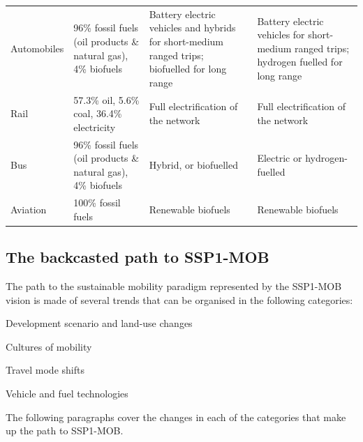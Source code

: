\begin{landscape}
{\begin{longtable}{p{3cm}p{5cm}p{5cm}p{5cm}}
Automobiles & 96\% fossil fuels (oil products \& natural gas), 4\% biofuels \parencite{iea2017_Statisticswebportal} & Battery electric vehicles and hybrids for short-medium ranged trips; biofuelled for long range & Battery electric vehicles for short-medium ranged trips; hydrogen fuelled for long range \\*
Rail & 57.3\% oil, 5.6\% coal, 36.4\% electricity \parencite{cazzola2016_RailwayHandbook2016} & Full electrification of the network & Full electrification of the network \\*
Bus & 96\% fossil fuels (oil products \& natural gas), 4\% biofuels \parencite{iea2017_Statisticswebportal} & Hybrid, or biofuelled & Electric or hydrogen-fuelled \\*
Aviation & 100\% fossil fuels \parencite{iea2017_Statisticswebportal} & Renewable biofuels & Renewable biofuels
\end{longtable}
}
\end{landscape}

\subsection{The backcasted path to SSP1-MOB}
\label{ss:results:backcasting-the-path}
The path to the sustainable mobility paradigm represented by the SSP1-MOB vision is made of several trends that can be organised in the following categories:
%
\begin{enumeratealpha}
\item Development scenario and land-use changes
\item Cultures of mobility
\item Travel mode shifts
\item Vehicle and fuel technologies
\end{enumeratealpha}
%
The following paragraphs cover the changes in each of the categories that make up the path to SSP1-MOB.

